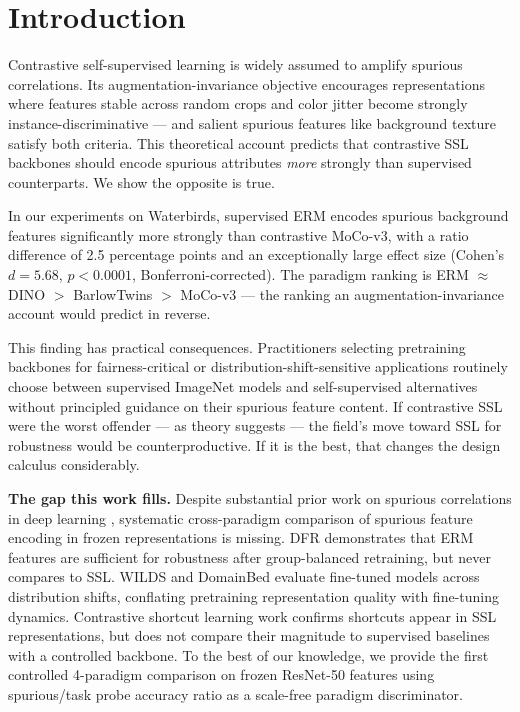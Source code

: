 \section{Introduction}

Contrastive self-supervised learning is widely assumed to amplify spurious correlations. Its augmentation-invariance objective encourages representations where features stable across random crops and color jitter become strongly instance-discriminative --- and salient spurious features like background texture satisfy both criteria. This theoretical account predicts that contrastive SSL backbones should encode spurious attributes \textit{more} strongly than supervised counterparts. We show the opposite is true.

In our experiments on Waterbirds, supervised ERM encodes spurious background features significantly more strongly than contrastive MoCo-v3, with a ratio difference of 2.5 percentage points and an exceptionally large effect size (Cohen's $d = 5.68$, $p < 0.0001$, Bonferroni-corrected). The paradigm ranking is ERM $\approx$ DINO $>$ BarlowTwins $>$ MoCo-v3 --- the ranking an augmentation-invariance account would predict in reverse.

This finding has practical consequences. Practitioners selecting pretraining backbones for fairness-critical or distribution-shift-sensitive applications routinely choose between supervised ImageNet models and self-supervised alternatives without principled guidance on their spurious feature content. If contrastive SSL were the worst offender --- as theory suggests --- the field's move toward SSL for robustness would be counterproductive. If it is the best, that changes the design calculus considerably.

\textbf{The gap this work fills.} Despite substantial prior work on spurious correlations in deep learning \citep{Sagawa2020GroupDRO, Kirichenko2022DFR, Geirhos2020Shortcut}, systematic cross-paradigm comparison of spurious feature encoding in frozen representations is missing. DFR \citep{Kirichenko2022DFR} demonstrates that ERM features are sufficient for robustness after group-balanced retraining, but never compares to SSL. WILDS \citep{Koh2021WILDS} and DomainBed \citep{Gulrajani2021DomainBed} evaluate fine-tuned models across distribution shifts, conflating pretraining representation quality with fine-tuning dynamics. Contrastive shortcut learning work \citep{Robinson2021Contrastive} confirms shortcuts appear in SSL representations, but does not compare their magnitude to supervised baselines with a controlled backbone. To the best of our knowledge, we provide the first controlled 4-paradigm comparison on frozen ResNet-50 features using spurious/task probe accuracy ratio as a scale-free paradigm discriminator.

